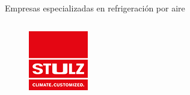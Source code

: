 \documentclass[aspectratio=169, compress]{beamer}
\begin{document}
\begin{frame}{Empresas especializadas en refrigeración por aire}
\begin{columns}
\begin{column}{0.5\textwidth}
            \begin{figure}
                \begin{center}
                    \includegraphics[scale=0.5]{./figures/stulz}
                \end{center}
            \end{figure}
        
        \end{column}
    \end{columns}

\end{frame}
\end{document}
